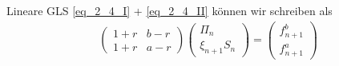 \begin{*remark}
	Lineare GLS \eqref{eq_2_4_I} + \eqref{eq_2_4_II} können wir schreiben als
	\begin{align*}
		\begin{pmatrix}
			1+r & b-r \\
			1+r & a-r
		\end{pmatrix} 
		\begin{pmatrix}
			\Pi_n\\
			\xi_{n+1} S_n
		\end{pmatrix} = 
		\begin{pmatrix}
			f^b_{n+1}\\
			f^a_{n+1}
		\end{pmatrix} \tag{LGS-1}\label{eq_LGS_1}
	\end{align*}
\end{*remark}
